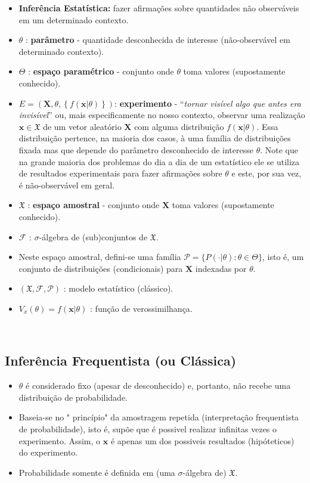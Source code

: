 \documentclass[
]{book}
\begin{document}
\begin{itemize}
\item
  \textbf{Inferência Estatística:} fazer afirmações sobre quantidades não observáveis em um determinado contexto.
\item
  \(\theta\) : \textbf{parâmetro} - quantidade desconhecida de interesse (não-observável em determinado contexto).
\item
  \(\Theta\) : \textbf{espaço paramétrico} - conjunto onde \(\theta\) toma valores (supostamente conhecido).
\item
  \(E=\left(\boldsymbol X, \theta, \left\{f(\boldsymbol x|\theta)\right\}\right)\): \textbf{experimento} - ``\emph{tornar visível algo que antes era invisível}'' ou, mais especificamente no nosso contexto, observar uma realização \(\boldsymbol x \in \mathfrak{X}\) de um vetor aleatório \(\boldsymbol X\) com alguma distribuição \(f(\boldsymbol x|\theta)\). Essa distribuição pertence, na maioria dos casos, à uma família de distribuições fixada mas que depende do parâmetro desconhecido de interesse \(\theta\). Note que na grande maioria dos problemas do dia a dia de um estatístico ele se utiliza de resultados experimentais para fazer afirmações sobre \(\theta\) e este, por sua vez, é não-observável em geral.
\item
  \(\mathfrak{X}\) : \textbf{espaço amostral} - conjunto onde \(\boldsymbol X\) toma valores (supostamente conhecido).
\item
  \(\mathcal{F}\) : \(\sigma\)-álgebra de (sub)conjuntos de \(\mathfrak{X}\).
\item
  Neste espaço amostral, defini-se uma família \(\mathcal{P}=\{P(\cdot|\theta): \theta \in \Theta\}\), isto é, um conjunto de distribuições (condicionais) para \(\boldsymbol X\) indexadas por \(\theta\).
\item
  \((\mathfrak{X},\mathcal{F},\mathcal{P})\) : modelo estatístico (clássico).
\item
  \(V_x(\theta)=f(\boldsymbol x |\theta)\) : função de verossimilhança.
\end{itemize}

\(~\)

\hypertarget{inferuxeancia-frequentista-ou-cluxe1ssica}{%
\subsection{Inferência Frequentista (ou Clássica)}\label{inferuxeancia-frequentista-ou-cluxe1ssica}}

\begin{itemize}
\item
  \(\theta\) é considerado fixo (apesar de desconhecido) e, portanto, não recebe uma distribuição de probabilidade.
\item
  Baseia-se no " princípio" da amostragem repetida (interpretação frequentista de probabilidade), isto é, supõe que é possivel realizar infinitas vezes o experimento. Assim, o \(\boldsymbol x\) é apenas um dos possiveis resultados (hipóteticos) do experimento.
\item
  Probabilidade somente é definida em (uma \(\sigma\)-álgebra de) \(\mathfrak{X}\).
\end{itemize}
\end{document}
